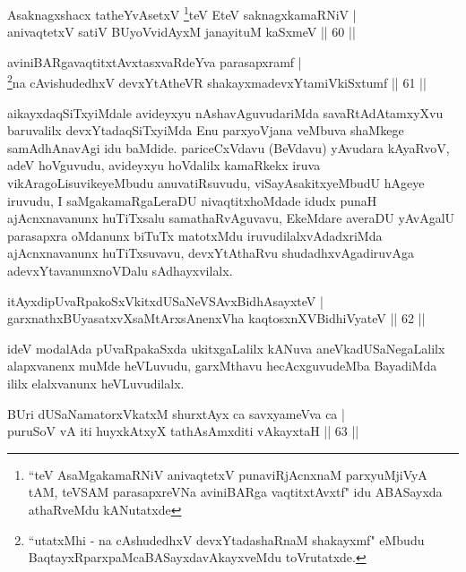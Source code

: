 \begin{shl}
Asaknagxshacx tatheYvA\s \s setxV \footnote{``teV AsaMgakamaRNiV anivaqtetxV punaviRjAcnxnaM parxyuMjiVyA tAM, teVSAM parasapxreVNa aviniBARga vaqtitxtAvxtf" idu ABASayxda athaRveMdu  kANutatxde }teV EteV saknagxkamaRNiV |\\
anivaqtetxV satiV BUyoV\s vidAyxM janayituM kaSxmeV \hfill || 60 ||
\end{shl}


\begin{shl}
aviniBARgavaqtitxtAvxtasxvaRdeYva parasapxramf |\\
\footnote{``utatxMhi - na cAshudedhxV devxYtadashaRnaM shakayxmf" eMbudu BaqtayxRparxpaMcaBASayxdavAkayxveMdu toVrutatxde.}na cAvishudedhxV devxYtAtheVR shakayxmadevxYtamiVkiSxtumf \hfill || 61 ||
\end{shl}

\begin{artha}
aikayxdaqSiTxyiMdale avideyxyu nAshavAguvudariMda savaR\-\break tAdAtamxyXvu baruvalilx devxYtadaqSiTxyiMda Enu parxyoVjana veMbuva shaMkege samAdhAnavAgi idu baMdide. \mdash  pariceCxVdavu (BeVdavu) yAvudara kAyaRvoV, adeV hoVguvudu, avideyxyu hoVdalilx kamaRkekx iruva vikAragoLisuvikeyeMbudu anuvatiRsuvudu, viSayAsakitxyeMbudU hAgeye iruvudu, I saMgakamaR\-\break gaLeraDU nivaqtitxhoMdade idudx punaH ajAcnxnavanunx huTiTxsalu samathaRvAguvavu, EkeMdare averaDU yAvAgalU parasapxra oMdanunx biTuTx matotxMdu iruvudilalxvAdadxriMda ajAcnxnavanunx huTiTxsuvavu, devxYtAthaRvu shudadhxvAgadiruvAga adevxYtavanunx\break noVDalu sAdhayxvilalx.
\end{artha}

\begin{shl}
itAyxdipUvaRpakoSxVkitxdUSaNeVSAvxBidhAsayxteV |\\
garxnathxBUyasatxvXsaMtArxsAnenxVha kaqtosxnXV\s BidhiVyateV \hfill || 62 ||
\end{shl}

\begin{artha}
ideV modalAda pUvaRpakaSxda ukitxgaLalilx kANuva aneVkadUSaNegaLalilx alapxvanenx muMde heVLuvudu, garxMthavu hecAcxguvudeMba BayadiMda ililx elalxvanunx heVLuvudilalx.
\end{artha}


\begin{shl}
BUri dUSaNamatorxVkatxM shurxtAyx ca savxyameVva ca |\\
puruSoV vA iti huyxkAtxyX tathA\s sAmxditi vAkayxtaH \hfill || 63 ||
\end{shl}

